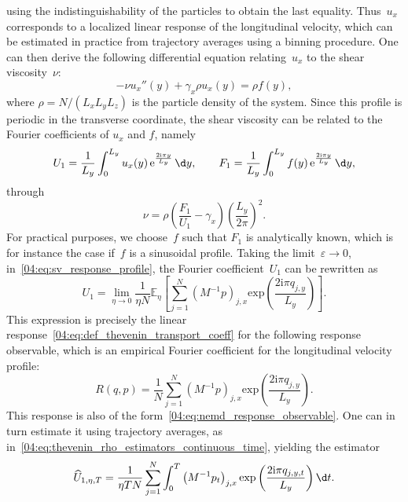 using the indistinguishability of the particles to obtain the last equality.
Thus~$u_x$ corresponds to a localized linear response of the longitudinal velocity, which can be estimated in practice from trajectory averages using a binning procedure. One can then derive the following differential equation relating~$u_x$ to the shear viscosity~$\nu$:
\begin{equation}
  \label{04:eq:equation_viscosity}
  -\nu u_x''(y)+\gamma_x\rho u_x(y) = \rho f(y),
\end{equation}
where $\rho = N/(L_xL_yL_z)$ is the particle density of the system.
Since this profile is periodic in the transverse coordinate, the shear viscosity can be related to the Fourier coefficients of $u_x$ and $f$, namely
\[U_1=\frac{1}{L_y}\int_0^{L_y}u_x(y)\,\mathrm{e}^{\frac{2\mathrm{i}\pi y}{L_y}}\,\d y,\qquad F_1 = \frac{1}{L_y}\int_0^{L_y}f(y)\,\mathrm{e}^{\frac{2\mathrm{i}\pi y}{L_y}}\,\d y,\]
through
\begin{equation}
    \label{04:eq:shear_viscosity}
    \nu = \rho\left(\frac{F_1}{U_1}-\gamma_x \right)\left(\frac{L_y}{2\pi}\right)^2.
\end{equation}
For practical purposes, we choose~$f$ such that $F_1$ is analytically known, which is for instance the case if~$f$ is a sinusoidal profile.
Taking the limit~$\varepsilon\to 0$, in~\eqref{04:eq:sv_response_profile}, the Fourier coefficient~$U_1$ can be rewritten as
\begin{equation}
    U_1 = \lim_{\eta \to 0} \frac1{\eta N}\mathbb{E}_\eta \left[\sum_{j=1}^N\left(M^{-1}p\right)_{j,x}\mathrm{exp}\left(\frac{2 \mathrm{i}\pi q_{j,y}}{L_y}\right)\right].
\end{equation}
This expression is precisely the linear response~\eqref{04:eq:def_thevenin_transport_coeff} for the following response observable, which is an empirical Fourier coefficient for the longitudinal velocity profile:
\begin{equation}
    \label{04:eq:shear_response}
    R(q,p)=\frac{1}{N}\sum_{j=1}^N\left(M^{-1}p\right)_{j,x}\mathrm{exp}\left(\frac{2\mathrm{i}\pi q_{j,y}}{L_y}\right).
\end{equation}
This response is also of the form~\eqref{04:eq:nemd_response_observable}.
One can in turn estimate it using trajectory averages, as in~\eqref{04:eq:thevenin_rho_estimators_continuous_time}, yielding the estimator
\begin{equation}
    \label{04:eq:ux_estimator}
    \widehat{U}_{1,\eta,T} = \frac1{\eta T N}\sum_{j=1}^{N} \int_0^T \left(M^{-1} p_t\right)_{j,x}\exp\left(\frac{2\mathrm{i}\pi q_{j,y,t}}{L_y}\right)\d t.
\end{equation}

